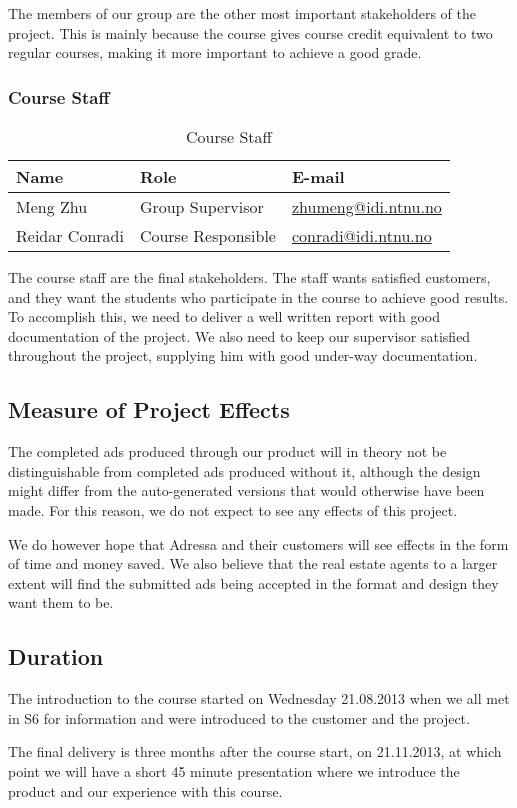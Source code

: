 The members of our group are the other most important stakeholders of the project. This is mainly because the course gives course credit equivalent to two regular courses, making it more important to achieve a good grade.

\subsubsection{Course Staff}
\begin{table}[H]
\begin{tabular}{|p{4cm}|p{4cm}|p{5cm}|}
\hline
\textbf{Name} & \textbf{Role} & \textbf{E-mail} \\
\hline
Meng Zhu & Group Supervisor & \href{mailto://zhumeng@idi.ntnu.no}{zhumeng@idi.ntnu.no}\\
\hline
Reidar Conradi & Course Responsible & \href{mailto://conradi@idi.ntnu.no}{conradi@idi.ntnu.no}\\
\hline
\end{tabular}
\caption{Course Staff}
\end{table}

The course staff are the final stakeholders. The staff wants satisfied customers, and they want the students who participate in the course to achieve good results. To accomplish this, we need to deliver a well written report with good documentation of the project. We also need to keep our supervisor satisfied throughout the project, supplying him with good under-way documentation.

\subsection{Measure of Project Effects}
The completed ads produced through our product will in theory not be distinguishable from completed ads produced without it, although the design might differ from the auto-generated versions that would otherwise have been made. For this reason, we do not expect to see any effects of this project.

We do however hope that Adressa and their customers will see effects in the form of time and money saved. We also believe that the real estate agents to a larger extent will find the submitted ads being accepted in the format and design they want them to be.

\subsection{Duration}
The introduction to the course started on Wednesday 21.08.2013 when we all met in S6 for information and were introduced to the customer and the project.

The final delivery is three months after the course start, on 21.11.2013, at which point we will have a short 45 minute presentation where we introduce the product and our experience with this course.